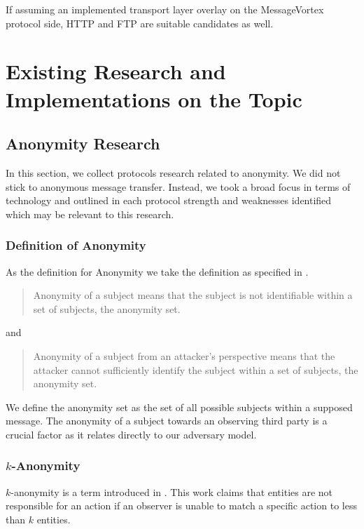 
If assuming an implemented transport layer overlay on the MessageVortex protocol side, HTTP and FTP are suitable candidates as well.

\chapter{Existing Research and Implementations on the Topic \label{sec:existingRD}}
\section{Anonymity Research}
In this section, we collect protocols research related to anonymity. We did not stick to anonymous message transfer. Instead, we took a broad focus in terms of technology and outlined in each protocol strength and weaknesses identified which may be relevant to this research.

\subsection{Definition of Anonymity}
As the definition for Anonymity we take the definition as specified in \cite{anon_terminology}.

\begin{quote}
	Anonymity of a subject means that the subject is not identifiable within a set of subjects, the anonymity set.\omitted
\end{quote}
and
\begin{quote}
	Anonymity of a subject from an attacker's perspective means that the attacker cannot sufficiently identify the subject within a set of subjects, the anonymity set.\omitted
\end{quote}

We define the anonymity set as the set of all possible subjects within a supposed message. The anonymity of a subject towards an observing third party is a crucial factor as it relates directly to our adversary model.

\subsection{\texorpdfstring{$k$}{k}-Anonymity}
$k$-anonymity is a term introduced in \cite{k-anonymous:ccs2003}. This work claims that entities are not responsible for an action if an observer is unable to match a specific action to less than $k$ entities.

